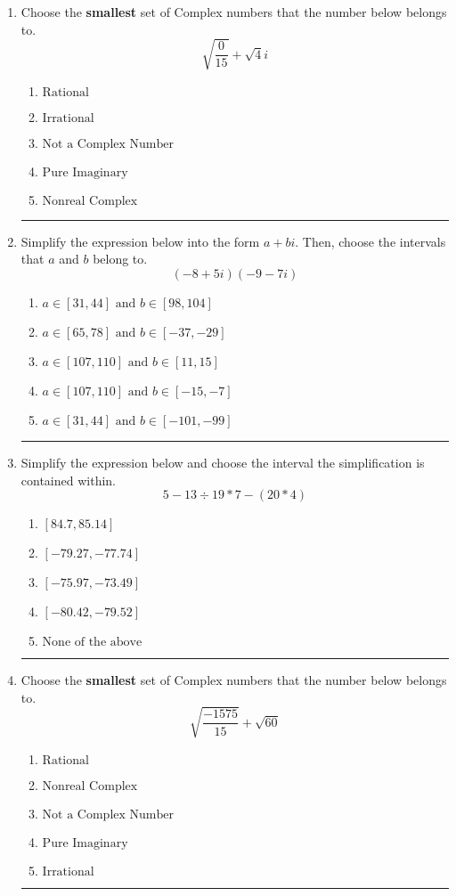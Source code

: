 \documentclass[14pt]{extbook}
\newcommand{\litem}[1]{\item#1\hspace*{-1cm}\rule{\textwidth}{0.4pt}}
\begin{document}
\begin{enumerate}
{\begin{enumerate}[label=\Alph*.]
\end{enumerate} }
\litem{
Choose the \textbf{smallest} set of Complex numbers that the number below belongs to.\[ \sqrt{\frac{0}{15}}+\sqrt{4}i \]\begin{enumerate}[label=\Alph*.]
\item \( \text{Rational} \)
\item \( \text{Irrational} \)
\item \( \text{Not a Complex Number} \)
\item \( \text{Pure Imaginary} \)
\item \( \text{Nonreal Complex} \)

\end{enumerate} }
\litem{
Simplify the expression below into the form $a+bi$. Then, choose the intervals that $a$ and $b$ belong to.\[ (-8 + 5 i)(-9 - 7 i) \]\begin{enumerate}[label=\Alph*.]
\item \( a \in [31, 44] \text{ and } b \in [98, 104] \)
\item \( a \in [65, 78] \text{ and } b \in [-37, -29] \)
\item \( a \in [107, 110] \text{ and } b \in [11, 15] \)
\item \( a \in [107, 110] \text{ and } b \in [-15, -7] \)
\item \( a \in [31, 44] \text{ and } b \in [-101, -99] \)

\end{enumerate} }
\litem{
Simplify the expression below and choose the interval the simplification is contained within.\[ 5 - 13 \div 19 * 7 - (20 * 4) \]\begin{enumerate}[label=\Alph*.]
\item \( [84.7, 85.14] \)
\item \( [-79.27, -77.74] \)
\item \( [-75.97, -73.49] \)
\item \( [-80.42, -79.52] \)
\item \( \text{None of the above} \)

\end{enumerate} }
\litem{
Choose the \textbf{smallest} set of Complex numbers that the number below belongs to.\[ \sqrt{\frac{-1575}{15}}+\sqrt{60} \]\begin{enumerate}[label=\Alph*.]
\item \( \text{Rational} \)
\item \( \text{Nonreal Complex} \)
\item \( \text{Not a Complex Number} \)
\item \( \text{Pure Imaginary} \)
\item \( \text{Irrational} \)


\end{enumerate}}
\end{enumerate}
\end{document}
